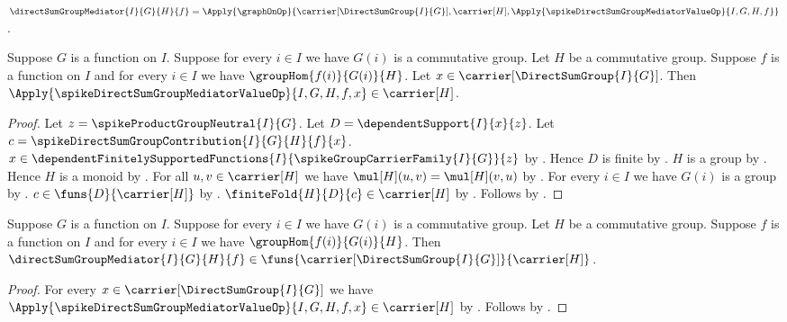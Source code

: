 \begin{definition}\label{spike_direct_sum_group_mediator}
    $\directSumGroupMediator{I}{G}{H}{f}
        =\Apply{\graphOnOp}{
            \carrier[\DirectSumGroup{I}{G}],\carrier[H],
            \Apply{\spikeDirectSumGroupMediatorValueOp}{I,G,H,f}}$.
\end{definition}

\begin{proposition}\label{spike_direct_sum_group_mediator_value_type}
    Suppose $G$ is a function on $I$.
    Suppose for every $i\in I$ we have $G(i)$ is a commutative group.
    Let $H$ be a commutative group.
    Suppose $f$ is a function on $I$ and
        for every $i\in I$ we have $\groupHom{f(i)}{G(i)}{H}$.
    Let $x\in\carrier[\DirectSumGroup{I}{G}]$.
    Then
        $\Apply{\spikeDirectSumGroupMediatorValueOp}{I,G,H,f,x}
            \in\carrier[H]$.
\end{proposition}
\begin{proof}
    Let $z=\spikeProductGroupNeutral{I}{G}$.
    Let $D=\dependentSupport{I}{x}{z}$.
    Let $c=\spikeDirectSumGroupContribution{I}{G}{H}{f}{x}$.
    $x\in\dependentFinitelySupportedFunctions
        {I}{\spikeGroupCarrierFamily{I}{G}}{z}$ by
        .
    Hence $D$ is finite by
        .
    $H$ is a group by .
    Hence $H$ is a monoid by .
    For all $u,v\in\carrier[H]$ we have
        $\mul[H](u,v)=\mul[H](v,u)$ by
        .
    For every $i\in I$ we have $G(i)$ is a group by
        .
    $c\in\funs{D}{\carrier[H]}$ by
        .
    $\finiteFold{H}{D}{c}\in\carrier[H]$ by
        .
    Follows by .
\end{proof}

\begin{proposition}\label{spike_direct_sum_group_mediator_type}
    Suppose $G$ is a function on $I$.
    Suppose for every $i\in I$ we have $G(i)$ is a commutative group.
    Let $H$ be a commutative group.
    Suppose $f$ is a function on $I$ and
        for every $i\in I$ we have $\groupHom{f(i)}{G(i)}{H}$.
    Then
        $\directSumGroupMediator{I}{G}{H}{f}\in
            \funs{\carrier[\DirectSumGroup{I}{G}]}{\carrier[H]}$.
\end{proposition}
\begin{proof}
    For every $x\in\carrier[\DirectSumGroup{I}{G}]$ we have
        $\Apply{\spikeDirectSumGroupMediatorValueOp}{I,G,H,f,x}
            \in\carrier[H]$ by
        .
    Follows by
        .
\end{proof}

